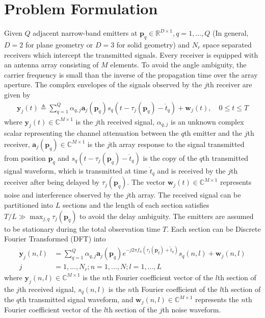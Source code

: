 \documentclass[review]{elsarticle}
\begin{document}
\section{Problem Formulation}
Given $Q$ adjacent narrow-band emitters at $\boldsymbol{p}_q\in \mathbb{R}^{D\times 1},q=1,...,Q$ (In general, $D=2$ for plane geometry or $D=3$ for solid geometry) and $N_r$ space separated receivers which intercept the transmitted signals. Every receiver is equipped with an antenna array consisting of $M$ elements. To avoid the angle ambiguity, the carrier frequency is small than the inverse of the propagation time over the array aperture. The complex envelopes of the signals observed by the $j$th receiver are given by
\begin{align}\label{yjt}
\boldsymbol{y}_j(t)\triangleq\sum_{q=1}^Q\alpha_{q,j}\boldsymbol{a}_j(\boldsymbol{p}_q)s_q(t-\tau_j(\boldsymbol{p}_q)-\mathring{t}_q)+\boldsymbol{w}_{j}(t),\quad 0\leq t\leq T
\end{align}
where $\boldsymbol{y}_j(t)\in \mathbb{C}^{M\times 1}$ is the $j$th received signal, $\alpha_{q,j}$ is an unknown complex scalar representing the channel attenuation between the $q$th emitter and the $j$th receiver, $\boldsymbol{a}_j(\boldsymbol{p}_q)\in \mathbb{C}^{M\times 1}$ is the $j$th array response to the signal transmitted from position $\boldsymbol{p}_q$ and $s_q(t-\tau_j(\boldsymbol{p}_q)-\mathring{t}_q)$ is the copy of the $q$th transmitted signal waveform, which is transmitted at time $\mathring{t}_q$ and is received by the $j$th receiver after being delayed by $\tau_j(\boldsymbol{p}_q)$. The vector $\boldsymbol{w}_j(t)\in \mathbb{C}^{M\times 1}$ represents noise and interference observed by the $j$th array. The received signal can be partitioned into $L$ sections and the length of each section satisfies $T/L\gg \max_{j,q}{\tau_j(\boldsymbol{p}_q)}$ to avoid the delay ambiguity. The emitters are assumed to be stationary during the total observation time $T$. Each section can be Discrete Fourier Transformed (DFT) into
\begin{align}\label{yjnl}
    \boldsymbol{y}_j(n,l)&=\sum_{q=1}^Q\alpha_{q,j}\boldsymbol{a}_j(\boldsymbol{p}_q)e^{-j2\pi f_n(\tau_j(\boldsymbol{p}_q)+\mathring{t}_q)}s_q(n,l)+\boldsymbol{w}_j(n,l)\\ \nonumber
    j&=1,...,N_r;n=1,...,N;l=1,...,L
\end{align}
where $\boldsymbol{y}_j(n,l)\in \mathbb{C}^{M\times 1}$ is the $n$th Fourier coefficient vector of the $l$th section of the $j$th received signal, $s_q(n,l)$ is the $n$th Fourier coefficient of the $l$th section of the $q$th transmitted signal waveform, and $\boldsymbol{w}_j(n,l)\in \mathbb{C}^{M\times 1}$ represents the $n$th Fourier coefficient vector of the $l$th section of the $j$th noise waveform.
\end{document}
